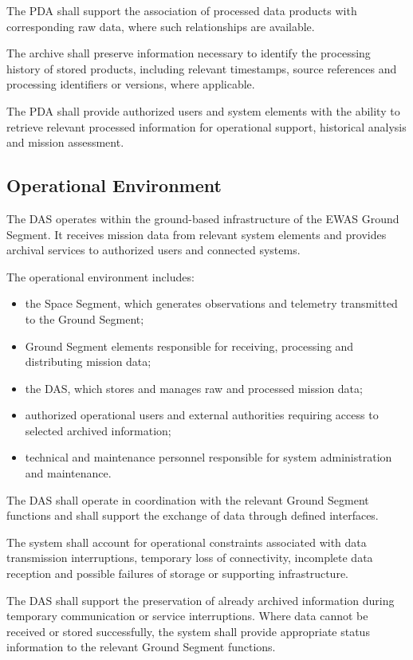 The PDA shall support the association of processed data products with corresponding raw data, where such relationships are available.

The archive shall preserve information necessary to identify the processing history of stored products, including relevant timestamps, source references and processing identifiers or versions, where applicable.

The PDA shall provide authorized users and system elements with the ability to retrieve relevant processed information for operational support, historical analysis and mission assessment.

\subsection{Operational Environment}

The DAS operates within the ground-based infrastructure of the EWAS Ground Segment. It receives mission data from relevant system elements and provides archival services to authorized users and connected systems.

The operational environment includes:

\begin{itemize}
    \item the Space Segment, which generates observations and telemetry transmitted to the Ground Segment;
    \item Ground Segment elements responsible for receiving, processing and distributing mission data;
    \item the DAS, which stores and manages raw and processed mission data;
    \item authorized operational users and external authorities requiring access to selected archived information;
    \item technical and maintenance personnel responsible for system administration and maintenance.
\end{itemize}

The DAS shall operate in coordination with the relevant Ground Segment functions and shall support the exchange of data through defined interfaces.

The system shall account for operational constraints associated with data transmission interruptions, temporary loss of connectivity, incomplete data reception and possible failures of storage or supporting infrastructure.

The DAS shall support the preservation of already archived information during temporary communication or service interruptions. Where data cannot be received or stored successfully, the system shall provide appropriate status information to the relevant Ground Segment functions.

